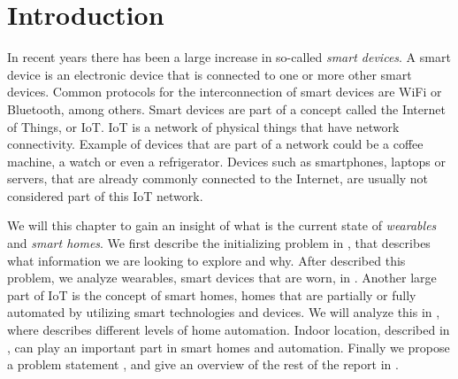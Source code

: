 \chapter{Introduction}\label{chap:introduction}
In recent years there has been a large increase in so-called \emph{smart devices}. 
A smart device is an electronic device that is connected to one or more other smart devices. 
Common protocols for the interconnection of smart devices are WiFi or Bluetooth, among others.
Smart devices are part of a concept called the Internet of Things, or IoT. 
IoT is a network of physical things that have network connectivity. 
Example of devices that are part of a network could be a coffee machine, a watch or even a refrigerator. 
Devices such as smartphones, laptops or servers, that are already commonly connected to the Internet, are usually not considered part of this IoT network. 

We will this chapter to gain an insight of what is the current state of \emph{wearables} and \emph{smart homes}. 
We first describe the initializing problem in , 
that describes what information we are looking to explore and why. 
After described this problem, we analyze wearables, \ie smart devices that are worn, in .
Another large part of IoT is the concept of smart homes, 
\ie homes that are partially or fully automated by utilizing smart technologies and devices. 
We will analyze this in , 
where  describes different levels of home automation. 
Indoor location, described in , 
can play an important part in smart homes and automation.
Finally we propose a problem statement , 
and give an overview of the rest of the report in .








